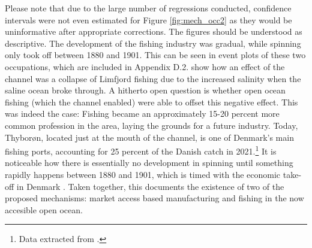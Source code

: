 \documentclass[11pt]{article}
\begin{document}
Please note that due to the large number of regressions conducted, confidence intervals were not even estimated for Figure \ref{fig:mech_occ2} as they would be uninformative after appropriate corrections. The figures should be understood as descriptive. The development of the fishing industry was gradual, while spinning only took off between 1880 and 1901. This can be seen in event plots of these two occupations, which are included in Appendix D.2. \cite{Poulsen2007} show how an effect of the channel was a collapse of Limfjord fishing due to the increased salinity when the saline ocean broke through. A hitherto open question is whether open ocean fishing (which the channel enabled) were able to offset this negative effect. This was indeed the case: Fishing became an approximately 15-20 percent more common profession in the area, laying the grounds for a future industry. Today, Thyborøn, located just at the mouth of the channel, is one of Denmark's main fishing ports, accounting for 25 percent of the Danish catch in 2021.\footnote{Data extracted from \cite{MinisterietforFodevarer2022}.} It is noticeable how there is essentially no development in spinning until something rapidly happens between 1880 and 1901, which is timed with the economic take-off in Denmark \citep{Khaustova2015}. Taken together, this documents the existence of two of the proposed mechanisms: market access based manufacturing and fishing in the now accesible open ocean. 
\end{document}
